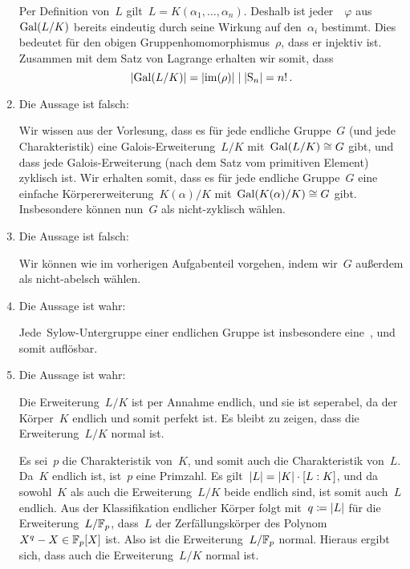 \documentclass{scrartcl}
\begin{document}
\begin{solution}
\begin{enumerate}
      Per Definition von~$L$ gilt~$L = K(\alpha_1, \dotsc, \alpha_n)$.
      Deshalb ist jeder~~$\varphi$ aus~$\operatorname{Gal}(L/K)$ bereits eindeutig durch seine Wirkung auf den~$\alpha_i$ bestimmt.
      Dies bedeutet für den obigen Gruppenhomomorphismus~$\rho$, dass er injektiv ist.
      Zusammen mit dem Satz von Lagrange erhalten wir somit, dass
      \[
        \lvert \operatorname{Gal}(L/K) \rvert
        =
        \lvert \operatorname{im}(\rho) \rvert
        \mid
        \lvert \operatorname{S}_n \rvert
        =
        n! \,.
      \]
    \item
      Die Aussage ist falsch:

      Wir wissen aus der Vorlesung, dass es für jede endliche Gruppe~$G$ (und jede Charakteristik) eine Galois-Erweiterung~$L/K$ mit~$\operatorname{Gal}(L/K) \cong G$ gibt, und dass jede Galois-Erweiterung (nach dem Satz vom primitiven Element) zyklisch ist.
      Wir erhalten somit, dass es für jede endliche Gruppe~$G$ eine einfache Körpererweiterung~$K(\alpha)/K$ mit~$\operatorname{Gal}(K(\alpha)/K) \cong G$ gibt.
      Insbesondere können nun~$G$ als nicht-zyklisch wählen.
    \item
      Die Aussage ist falsch:

      Wir können wie im vorherigen Aufgabenteil vorgehen, indem wir~$G$ außerdem als nicht-abelsch wählen.
    \item
      Die Aussage ist wahr:

      Jede~Sylow-Untergruppe einer endlichen Gruppe ist insbesondere eine~, und somit auflösbar.
    \item
      Die Aussage ist wahr:

      Die Erweiterung~$L/K$ ist per Annahme endlich, und sie ist seperabel, da der Körper~$K$ endlich und somit perfekt ist.
      Es bleibt zu zeigen, dass die Erweiterung~$L/K$ normal ist.

      Es sei~$p$ die Charakteristik von~$K$, und somit auch die Charakteristik von~$L$.
      Da~$K$ endlich ist, ist~$p$ eine Primzahl.
      Es gilt~$\lvert L\rvert = \lvert K\rvert \cdot [L : K]$, und da sowohl~$K$ als auch die Erweiterung~$L/K$ beide endlich sind, ist somit auch~$L$ endlich.
      Aus der Klassifikation endlicher Körper folgt mit~$q \coloneqq \lvert L\rvert$ für die Erweiterung~$L/\mathbb{F}_p$, dass~$L$ der Zerfällungskörper des Polynom~$X^q - X \in \mathbb{F}_p[X]$ ist.
      Also ist die Erweiterung~$L/\mathbb{F}_p$ normal.
      Hieraus ergibt sich, dass auch die Erweiterung~$L/K$ normal ist.
  \end{enumerate}
\end{solution}
\end{document}
